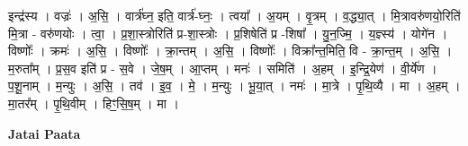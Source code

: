 \documentclass[17pt]{extarticle}
\begin{document}
इन्द्र॑स्य । वज्रः॑ । अ॒सि॒ । वार्त्र॑घ्न॒ इति॒ वार्त्र॑-घ्नः॒ । त्वया᳚ । अ॒यम् । वृ॒त्रम् । व॒द्ध्या॒त् । मि॒त्रावरु॑णयो॒रिति॑ मि॒त्रा - वरु॑णयोः । त्वा॒ । प्र॒शा॒स्त्रोरिति॑ प्र-शा॒स्त्रोः । प्र॒शिषेति॑ प्र -शिषा᳚ । यु॒न॒ज्मि॒ । य॒ज्ञ्स्य॑ । योगे॑न । विष्णोः᳚ । क्रमः॑ । अ॒सि॒ । विष्णोः᳚ । क्रा॒न्तम् । अ॒सि॒ । विष्णोः᳚ । विक्रा᳚न्त॒मिति॒ वि - क्रा॒न्त॒म् । अ॒सि॒ । म॒रुता᳚म् । प्र॒स॒व इति॑ प्र - स॒वे । जे॒ष॒म् । आ॒प्तम् । मनः॑ । समिति॑ । अ॒हम् । इ॒न्द्रि॒येण॑ । वी॒र्ये॑ण । प॒शू॒नाम् । म॒न्युः । अ॒सि॒ । तव॑ । इ॒व॒ । मे॒ । म॒न्युः । भू॒या॒त् । नमः॑ । मा॒त्रे । पृ॒थि॒व्यै । मा । अ॒हम् । मा॒तर᳚म् । पृ॒थि॒वीम् । हिꣳ॒॒सि॒ष॒म् । मा ।  \newline



\textbf{Jatai Paata} \newline
\end{document}

